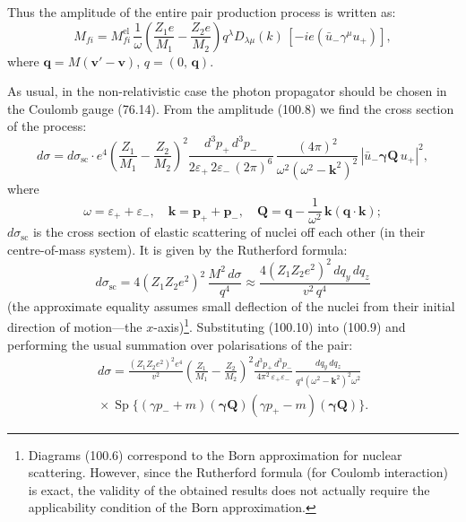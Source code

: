 
Thus the amplitude of the entire pair production process is written as:
\begin{equation}
M_{fi} = M_{fi}^\text{el}\,\frac{1}{\omega}\!\left(\frac{Z_1 e}{M_1} - \frac{Z_2 e}{M_2}\right)q^\lambda D_{\lambda\mu}(k)\,[-ie(\bar{u}_- \gamma^\mu u_+)],
\label{eq:100.8}
\end{equation}
where $\mathbf{q} = M(\mathbf{v}' - \mathbf{v})$, $q = (0,\,\mathbf{q})$.

As usual, in the non-relativistic case the photon propagator should be chosen in the Coulomb gauge (76.14). From the amplitude (100.8) we find the cross section of the process:
\begin{equation}
d\sigma = d\sigma_\text{sc}\cdot e^4\!\left(\frac{Z_1}{M_1} - \frac{Z_2}{M_2}\right)^{\!2}\frac{d^3 p_+\,d^3 p_-}{2\varepsilon_+\,2\varepsilon_-\,(2\pi)^6}\,\frac{(4\pi)^2}{\omega^2(\omega^2 - \mathbf{k}^2)^2}\,|\bar{u}_- \boldsymbol{\gamma}\mathbf{Q}\,u_+|^2,
\label{eq:100.9}
\end{equation}
where
\[
\omega = \varepsilon_+ + \varepsilon_-, \quad \mathbf{k} = \mathbf{p}_+ + \mathbf{p}_-, \quad \mathbf{Q} = \mathbf{q} - \frac{1}{\omega^2}\,\mathbf{k}(\mathbf{q}\cdot\mathbf{k});
\]
$d\sigma_\text{sc}$ is the cross section of elastic scattering of nuclei off each other (in their centre-of-mass system). It is given by the Rutherford formula:
\begin{equation}
d\sigma_\text{sc} = 4(Z_1 Z_2 e^2)^2\,\frac{M^2\,d\sigma}{q^4} \approx \frac{4(Z_1 Z_2 e^2)^2\,dq_y\,dq_z}{v^2\,q^4}
\label{eq:100.10}
\end{equation}
(the approximate equality assumes small deflection of the nuclei from their initial direction of motion---the $x$-axis)\footnote{Diagrams (100.6) correspond to the Born approximation for nuclear scattering. However, since the Rutherford formula (for Coulomb interaction) is exact, the validity of the obtained results does not actually require the applicability condition of the Born approximation.}. Substituting (100.10) into (100.9) and performing the usual summation over polarisations of the pair:
\begin{multline}
d\sigma = \frac{(Z_1 Z_2 e^2)^2 e^4}{v^2}\!\left(\frac{Z_1}{M_1} - \frac{Z_2}{M_2}\right)^{\!2}\frac{d^3 p_+\,d^3 p_-}{4\pi^2\,\varepsilon_+\varepsilon_-}\,\frac{dq_y\,dq_z}{q^4(\omega^2 - \mathbf{k}^2)^2\omega^2} \\
{}\times \operatorname{Sp}\{(\gamma p_- + m)(\boldsymbol{\gamma}\mathbf{Q})(\gamma p_+ - m)(\boldsymbol{\gamma}\mathbf{Q})\}.
\label{eq:100.11}
\end{multline}

